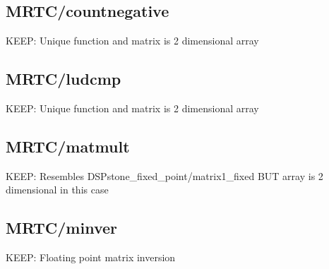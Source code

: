 \documentclass[a4paper]{article}
\begin{document}
  \subsection{MRTC/countnegative}
  	KEEP: Unique function and matrix is 2 dimensional array
  \subsection{MRTC/ludcmp}
  	KEEP: Unique function and matrix is 2 dimensional array
  \subsection{MRTC/matmult}
  	KEEP: Resembles DSPstone\_fixed\_point/matrix1\_fixed BUT array is 2 dimensional in this case
  \subsection{MRTC/minver}
  	KEEP: Floating point matrix inversion
\end{document}
